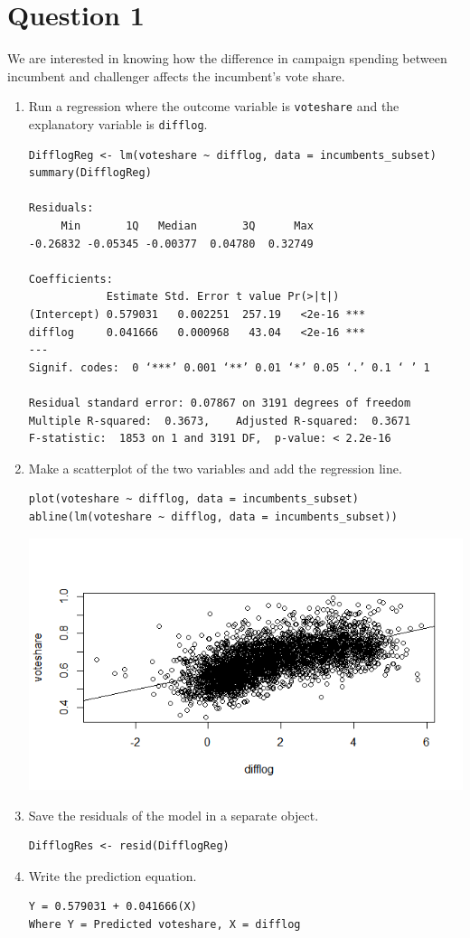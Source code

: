\documentclass[12pt,letterpaper]{article}
\begin{document}
\section*{Question 1}
\vspace{.25cm}
\noindent We are interested in knowing how the difference in campaign spending between incumbent and challenger affects the incumbent's vote share. 
	\begin{enumerate}
		\item Run a regression where the outcome variable is \texttt{voteshare} and the explanatory variable is \texttt{difflog}.	
\begin{verbatim}
DifflogReg <- lm(voteshare ~ difflog, data = incumbents_subset)
summary(DifflogReg)

Residuals:
     Min       1Q   Median       3Q      Max 
-0.26832 -0.05345 -0.00377  0.04780  0.32749 

Coefficients:
            Estimate Std. Error t value Pr(>|t|)    
(Intercept) 0.579031   0.002251  257.19   <2e-16 ***
difflog     0.041666   0.000968   43.04   <2e-16 ***
---
Signif. codes:  0 ‘***’ 0.001 ‘**’ 0.01 ‘*’ 0.05 ‘.’ 0.1 ‘ ’ 1

Residual standard error: 0.07867 on 3191 degrees of freedom
Multiple R-squared:  0.3673,	Adjusted R-squared:  0.3671 
F-statistic:  1853 on 1 and 3191 DF,  p-value: < 2.2e-16
\end{verbatim}
\vspace{5cm}


		\item Make a scatterplot of the two variables and add the regression line. 	
\begin{verbatim}
plot(voteshare ~ difflog, data = incumbents_subset)
abline(lm(voteshare ~ difflog, data = incumbents_subset))
\end{verbatim}
\includegraphics[width=.75\textwidth]{Rplot1}
\vspace{7cm}

		\item Save the residuals of the model in a separate object.
\begin{verbatim}
DifflogRes <- resid(DifflogReg)
\end{verbatim}
\vspace{7cm}
		\item Write the prediction equation.
\begin{verbatim}
Y = 0.579031 + 0.041666(X)
Where Y = Predicted voteshare, X = difflog
\end{verbatim}
	\end{enumerate}
	
\end{document}
